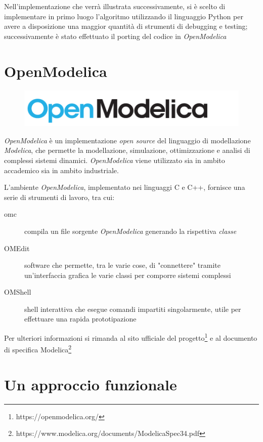 \documentclass[11pt,a4paper]{report}
\begin{document}
Nell'implementazione che verrà illustrata successivamente, si è scelto di implementare in primo luogo l'algoritmo utilizzando il linguaggio Python per avere a disposizione una maggior quantità di strumenti di debugging e testing; successivamente è stato effettuato il porting del codice in \textit{OpenModelica}

\section{OpenModelica}

\begin{figure}[H]
\centering
\includegraphics[scale=0.5]{openmodelica.png}
\end{figure}

\textit{OpenModelica} è un implementazione \textit{open source} del linguaggio di modellazione \textit{Modelica}, che permette la modellazione, simulazione, ottimizzazione e analisi di complessi sistemi dinamici. \textit{OpenModelica} viene utilizzato sia in ambito accademico sia in ambito industriale.

L'ambiente \textit{OpenModelica}, implementato nei linguaggi C e C++, fornisce una serie di strumenti di lavoro, tra cui:

\begin{description}
	\item[omc] compila un file sorgente \textit{OpenModelica} generando la rispettiva \textit{classe}
	\item[OMEdit] software che permette, tra le varie cose, di "connettere" tramite un'interfaccia grafica le varie classi per comporre sistemi complessi
	\item[OMShell] shell interattiva che esegue comandi impartiti singolarmente, utile per effettuare una rapida prototipazione
\end{description}

Per ulteriori informazioni si rimanda al sito ufficiale del progetto\footnote{https://openmodelica.org/} e al documento di specifica Modelica\footnote{https://www.modelica.org/documents/ModelicaSpec34.pdf}

\section{Un approccio funzionale}
\end{document}
